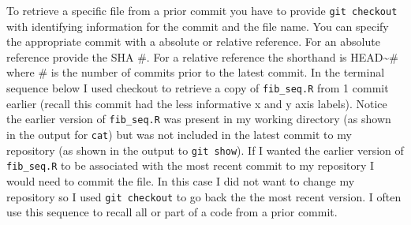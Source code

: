 \documentclass[
  letterpaper,
  DIV=11,
  numbers=noendperiod]{scrreprt}
\begin{document}
To retrieve a specific file from a prior commit you have to provide
\texttt{git\ checkout} with identifying information for the commit and
the file name. You can specify the appropriate commit with a absolute or
relative reference. For an absolute reference provide the SHA \#. For a
relative reference the shorthand is HEAD\textasciitilde\# where \# is
the number of commits prior to the latest commit. In the terminal
sequence below I used checkout to retrieve a copy of \texttt{fib\_seq.R}
from 1 commit earlier (recall this commit had the less informative x and
y axis labels). Notice the earlier version of \texttt{fib\_seq.R} was
present in my working directory (as shown in the output for
\texttt{cat}) but was not included in the latest commit to my repository
(as shown in the output to \texttt{git\ show}). If I wanted the earlier
version of \texttt{fib\_seq.R} to be associated with the most recent
commit to my repository I would need to commit the file. In this case I
did not want to change my repository so I used \texttt{git\ checkout} to
go back the the most recent version. I often use this sequence to recall
all or part of a code from a prior commit.
\end{document}
